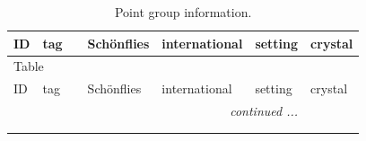 \documentclass[fleqn,10pt]{jsarticle}
\begin{document}
\setcounter{MaxMatrixCols}{32}

\renewcommand{\tablename}{Table~}
\renewcommand{\figurename}{Figure~}
\begin{center}
\renewcommand{\arraystretch}{1.0}
\begin{longtable}{lllllll}
\caption{Point group information.}
 \\
 \hline \hline
ID & tag &  & Sch\"onflies & international & setting & crystal \\ \hline \endfirsthead

\multicolumn{6}{l}{\tablename\ \thetable{}} \\
 \hline \hline
ID & tag &  & Sch\"onflies & international & setting & crystal \\ \hline \endhead

 \hline \hline
\multicolumn{6}{r}{\footnotesize\it continued ...} \\ \endfoot

 \hline \hline
\multicolumn{6}{r}{} \\ \endlastfoot


\end{longtable}
\end{center}
\end{document}
